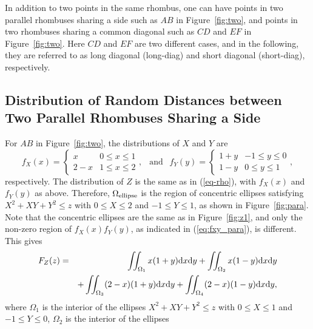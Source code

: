 \documentclass[12pt,draftclsnofoot,onecolumn]{IEEEtran}
\begin{document}
In addition to two points in the same rhombus, one can have points in two parallel rhombuses
sharing a side such as $AB$ in Figure~\ref{fig:two}, and points in two
rhombuses sharing a common diagonal such as $CD$ and $EF$ in Figure~\ref{fig:two}.
Here $CD$ and $EF$ are two different cases, and in the following, they are referred to
as long diagonal (long-diag) and short diagonal (short-diag), respectively.

\subsection{Distribution of Random Distances between Two Parallel Rhombuses Sharing a Side}

For $AB$ in Figure~\ref{fig:two}, the distributions of $X$ and $Y$ are
\begin{equation}\label{eq:fxy_para}
  f_X(x)=\left\{
    \begin{array}{lr}
      x & 0\leq x \leq 1 \\
      2-x & 1 \leq x \leq 2
    \end{array}
  \right.,
  ~~\mbox{ and }~~ f_Y(y)=\left\{
    \begin{array}{lr}
      1+y & -1\leq y \leq 0 \\
      1-y & 0 \leq y \leq 1
    \end{array}
  \right.,
\end{equation}
respectively.
The distribution of $Z$ is the same as in (\ref{eq-rho}), with
$f_X(x)$ and $f_Y(y)$ as above.
Therefore, $\Omega_{\rm ellipse}$ %
is the region of concentric ellipses satisfying $X^2+XY+Y^2 \leq z$ with $0 \leq X \leq 2$ and $-1\leq Y \leq 1$,
as shown in Figure~\ref{fig:para}.
Note that the concentric ellipses are the same as in Figure~\ref{fig:z1},
and only the non-zero region of $f_X(x)f_Y(y)$, as indicated in (\ref{eq:fxy_para}), is different.
This gives
\begin{eqnarray}\label{eq:para}
 F_Z(z)&=&\iint_{\Omega_1}x(1+y){\rm d}x{\rm d}y+\iint_{\Omega_2}x(1-y){\rm
d}x{\rm d}y\nonumber \\
&&+\iint_{\Omega_3}(2-x)(1+y){\rm d}x{\rm d}y+\iint_{\Omega_4}(2-x)(1-y){\rm
d}x{\rm d}y,
\end{eqnarray}
where $\Omega_1$ is the interior of the ellipses $X^2+XY+Y^2 \leq z$ with $0 \leq X
\leq 1$ and $-1 \leq Y \leq 0$, $\Omega_2$ is the interior of the ellipses
\end{document}
